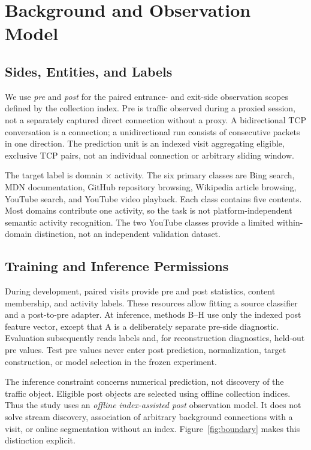 \section{Background and Observation Model}
\subsection{Sides, Entities, and Labels}
We use \emph{pre} and \emph{post} for the paired entrance- and exit-side observation scopes defined by the collection index. Pre is traffic observed during a proxied session, not a separately captured direct connection without a proxy. A bidirectional TCP conversation is a connection; a unidirectional run consists of consecutive packets in one direction. The prediction unit is an indexed visit aggregating eligible, exclusive TCP pairs, not an individual connection or arbitrary sliding window.

The target label is domain $\times$ activity. The six primary classes are Bing search, MDN documentation, GitHub repository browsing, Wikipedia article browsing, YouTube search, and YouTube video playback. Each class contains five contents. Most domains contribute one activity, so the task is not platform-independent semantic activity recognition. The two YouTube classes provide a limited within-domain distinction, not an independent validation dataset.

\subsection{Training and Inference Permissions}
During development, paired visits provide pre and post statistics, content membership, and activity labels. These resources allow fitting a source classifier and a post-to-pre adapter. At inference, methods B--H use only the indexed post feature vector, except that A is a deliberately separate pre-side diagnostic. Evaluation subsequently reads labels and, for reconstruction diagnostics, held-out pre values. Test pre values never enter post prediction, normalization, target construction, or model selection in the frozen experiment.

The inference constraint concerns numerical prediction, not discovery of the traffic object. Eligible post objects are selected using offline collection indices. Thus the study uses an \emph{offline index-assisted post} observation model. It does not solve stream discovery, association of arbitrary background connections with a visit, or online segmentation without an index. Figure~\ref{fig:boundary} makes this distinction explicit.

